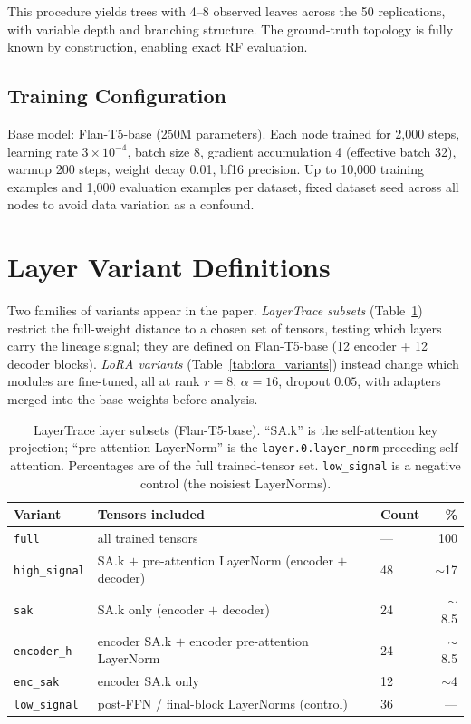 \documentclass{article}
\theoremstyle{definition}
\theoremstyle{plain}
\begin{document}
This procedure yields trees with 4--8 observed leaves across the 50 replications, with variable depth and branching structure. The ground-truth topology is fully known by construction, enabling exact RF evaluation.

\subsection*{Training Configuration}
Base model: Flan-T5-base (250M parameters). Each node trained for 2,000 steps, learning rate $3 \times 10^{-4}$, batch size 8, gradient accumulation 4 (effective batch 32), warmup 200 steps, weight decay 0.01, bf16 precision. Up to 10,000 training examples and 1,000 evaluation examples per dataset, fixed dataset seed across all nodes to avoid data variation as a confound.

\section{Layer Variant Definitions}
\label{app:layers}
Two families of variants appear in the paper. \emph{LayerTrace subsets} (Table~\ref{tab:layer_subsets})
restrict the full-weight distance to a chosen set of tensors, testing which layers carry the lineage
signal; they are defined on Flan-T5-base (12 encoder + 12 decoder blocks). \emph{LoRA variants}
(Table~\ref{tab:lora_variants}) instead change which modules are fine-tuned, all at rank $r=8$,
$\alpha=16$, dropout $0.05$, with adapters merged into the base weights before analysis.

\begin{table}[h]
\caption{LayerTrace layer subsets (Flan-T5-base). ``SA.k'' is the self-attention key projection;
``pre-attention LayerNorm'' is the \texttt{layer.0.layer\_norm} preceding self-attention. Percentages
are of the full trained-tensor set. \texttt{low\_signal} is a negative control (the noisiest LayerNorms).}
\label{tab:layer_subsets}
\centering
\begin{tabular}{lll r}
\toprule
Variant & Tensors included & Count & \% \\
\midrule
\texttt{full}        & all trained tensors                                   & ---  & 100 \\
\texttt{high\_signal}& SA.k $+$ pre-attention LayerNorm (encoder $+$ decoder) & 48   & $\sim$17 \\
\texttt{sak}         & SA.k only (encoder $+$ decoder)                       & 24   & $\sim$8.5 \\
\texttt{encoder\_h}  & encoder SA.k $+$ encoder pre-attention LayerNorm      & 24   & $\sim$8.5 \\
\texttt{enc\_sak}    & encoder SA.k only                                     & 12   & $\sim$4 \\
\texttt{low\_signal} & post-FFN / final-block LayerNorms (control)           & 36   & --- \\
\bottomrule
\end{tabular}
\end{table}
\end{document}
